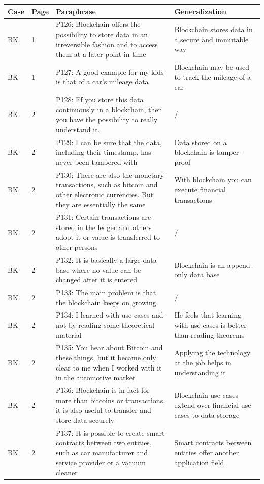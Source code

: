 \begin{table}[H]
    \centering
    \begin{tabularx}{\textwidth}{ll|X|p{4.5cm}}
	Case & Page & Paraphrase & Generalization \\ \hline
	BK & 1 & P126: Blockchain offers the possibility to store data in an irreversible fashion and to access them at a later point in time & Blockchain stores data in a secure and immutable way \\  
	BK & 1 & P127: A good example for my kids is that of a car's mileage data & Blockchain may be used to track the mileage of a car \\  
	BK & 2 & P128: Ff you store this data continuously in a blockchain, then you have the possibility to really understand it. & / \\  
	BK & 2 & P129: I can be sure that the data, including their timestamp, has never been tampered with & Data stored on a blockchain is tamper-proof \\  
	BK & 2 & P130: There are also the monetary transactions, such as bitcoin and other electronic currencies. But they are essentially the same & With blockchain you can execute financial transactions \\  
	BK & 2 & P131: Certain transactions are stored in the ledger and others adopt it or value is transferred to other persons & / \\  
	BK & 2 & P132: It is basically a large data base where no value can be changed after it is entered & Blockchain is an append-only data base \\  
	BK & 2 & P133: The main problem is that the blockchain keeps on growing &  / \\  
	BK & 2 & P134: I learned with use cases and not by reading some theoretical material & He feels that learning with use cases is better than reading theorems  \\  
	BK & 2 & P135: You hear about Bitcoin and these things, but it became only clear to me when I worked with it in the automotive market & Applying the technology at the job helps in understanding it \\  
	BK & 2 & P136: Blockchain is in fact for more than bitcoins or transactions, it is also useful to transfer and store data securely & Blockchain use cases extend over financial use cases to data storage \\  
	BK & 2 & P137: It is possible to create smart contracts between two entities, such as car manufacturer and service provider or a vacuum cleaner & Smart contracts between entities offer another application field \\  

\end{tabularx}
\end{table}

